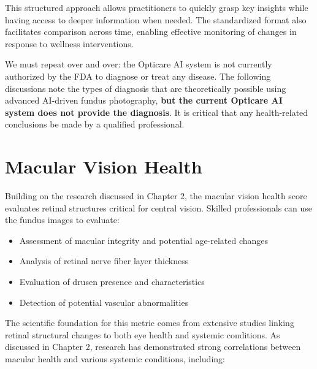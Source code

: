 \documentclass[
  Letterpaper,
]{scrbook}
\providecommand{\tightlist}{%
  \setlength{\itemsep}{0pt}\setlength{\parskip}{0pt}}\usepackage{longtable,booktabs,array}
\begin{document}
This structured approach allows practitioners to quickly grasp key
insights while having access to deeper information when needed. The
standardized format also facilitates comparison across time, enabling
effective monitoring of changes in response to wellness interventions.

\begin{tcolorbox}[enhanced jigsaw, opacityback=0, titlerule=0mm, toptitle=1mm, breakable, arc=.35mm, colframe=quarto-callout-caution-color-frame, coltitle=black, colbacktitle=quarto-callout-caution-color!10!white, bottomtitle=1mm, rightrule=.15mm, leftrule=.75mm, title=\textcolor{quarto-callout-caution-color}{\faFire}\hspace{0.5em}{Caution: Not Intended for Diagnosis}, bottomrule=.15mm, colback=white, toprule=.15mm, opacitybacktitle=0.6, left=2mm]

We must repeat over and over: the Opticare AI system is not currently
authorized by the FDA to diagnose or treat any disease. The following
discussions note the types of diagnosis that are theoretically possible
using advanced AI-driven fundus photography, \textbf{but the current
Opticare AI system does not provide the diagnosis}. It is critical that
any health-related conclusions be made by a qualified professional.

\end{tcolorbox}

\section{Macular Vision Health}\label{macular-vision-health}

Building on the research discussed in Chapter 2, the macular vision
health score evaluates retinal structures critical for central vision.
Skilled professionals can use the fundus images to evaluate:

\begin{itemize}
\tightlist
\item
  Assessment of macular integrity and potential age-related changes
\item
  Analysis of retinal nerve fiber layer thickness
\item
  Evaluation of drusen presence and characteristics
\item
  Detection of potential vascular abnormalities
\end{itemize}

The scientific foundation for this metric comes from extensive studies
linking retinal structural changes to both eye health and systemic
conditions. As discussed in Chapter 2, research has demonstrated strong
correlations between macular health and various systemic conditions,
including:
\end{document}

